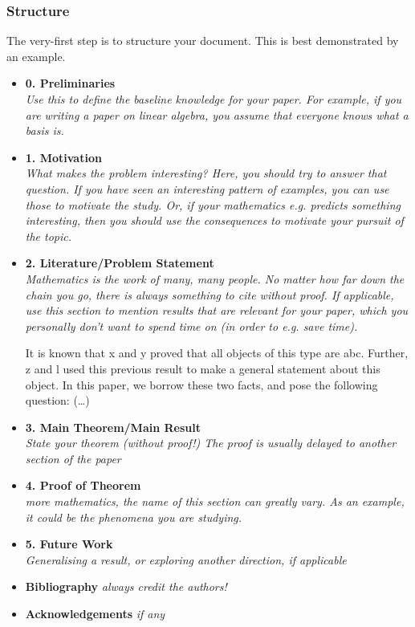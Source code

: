 \documentclass[12pt]{article}
\begin{document}
\subsubsection{Structure}
The very-first step is to structure your document. This is best demonstrated by an example.
\begin{center}
    \begin{itemize}
        \item[] \textbf{0. Preliminaries}\\
        \emph{Use this to define the baseline knowledge for your paper. For example, if you are writing a paper on linear algebra, you assume that everyone knows what a basis is.}
        \item[] \textbf{1. Motivation}\\
        \emph{What makes the problem interesting? Here, you should try to answer that question. If you have seen an interesting pattern of examples, you can use those to motivate the study. Or, if your mathematics e.g. predicts something interesting, then you should use the consequences to motivate your pursuit of the topic.}
        \item[] \textbf{2. Literature/Problem Statement}\\
        \emph{Mathematics is the work of many, many people. No matter how far down the chain you go, there is always something to cite without proof. If applicable, use this section to mention results that are relevant for your paper, which you personally don't want to spend time on (in order to e.g. save time).}
        \begin{example}
            It is known that x and y proved that all objects of this type are abc. Further, z and l used this previous result to make a general statement about this object. In this paper, we borrow these two facts, and pose the following question: (\dots)
        \end{example}
        \item[] \textbf{3. Main Theorem/Main Result}\\
        \emph{State your theorem (without proof!) The proof is usually delayed to another section of the paper}
        \item[] \textbf{4. Proof of Theorem }\\ \emph{more mathematics, the name of this section can greatly vary. As an example, it could be the phenomena you are studying.}
        \item[] \textbf{5. Future Work}\\ \emph{Generalising a result, or exploring another direction, if applicable}
        \item[] \textbf{Bibliography} \hfill \emph{always credit the authors!}
        \item[] \textbf{Acknowledgements} \hfill \emph{if any}
    \end{itemize}
\end{center}
\end{document}

